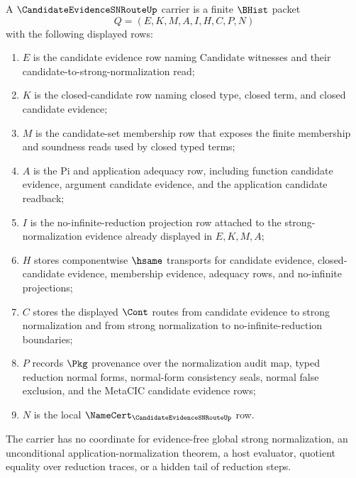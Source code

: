 \begin{definition}
\label{def:candidate-evidence-sn-route-carrier}
A $\CandidateEvidenceSNRouteUp$ carrier is a finite $\BHist$ packet
$$
Q=(E,K,M,A,I,H,C,P,N)
$$
with the following displayed rows:
\begin{enumerate}
\item $E$ is the candidate evidence row naming $\mathrm{Candidate}$ witnesses and their candidate-to-strong-normalization read;
\item $K$ is the closed-candidate row naming closed type, closed term, and closed candidate evidence;
\item $M$ is the candidate-set membership row that exposes the finite membership and soundness reads used by closed typed terms;
\item $A$ is the Pi and application adequacy row, including function candidate evidence, argument candidate evidence, and the application candidate readback;
\item $I$ is the no-infinite-reduction projection row attached to the strong-normalization evidence already displayed in $E,K,M,A$;
\item $H$ stores componentwise $\hsame$ transports for candidate evidence, closed-candidate evidence, membership evidence, adequacy rows, and no-infinite projections;
\item $C$ stores the displayed $\Cont$ routes from candidate evidence to strong normalization and from strong normalization to no-infinite-reduction boundaries;
\item $P$ records $\Pkg$ provenance over the normalization audit map, typed reduction normal forms, normal-form consistency seals, normal false exclusion, and the MetaCIC candidate evidence rows;
\item $N$ is the local $\NameCert_{\CandidateEvidenceSNRouteUp}$ row.
\end{enumerate}
The carrier has no coordinate for evidence-free global strong normalization, an unconditional application-normalization theorem, a host evaluator, quotient equality over reduction traces, or a hidden tail of reduction steps.
\end{definition}

